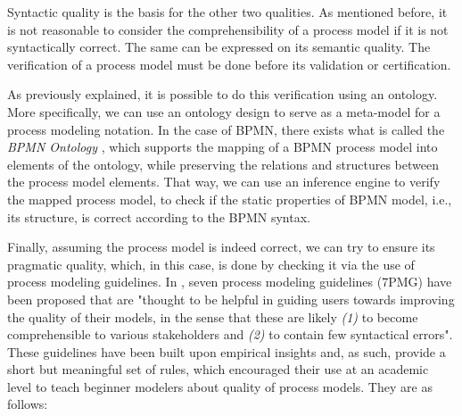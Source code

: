 \documentclass[a4paper,twoside]{article}
\begin{document}
Syntactic quality is the basis for the other two qualities. As mentioned before, it is not reasonable to consider the comprehensibility of a process model if it is not syntactically correct. The same can be expressed on its semantic quality. The verification of a process model must be done before its validation or certification.

As previously explained, it is possible to do this verification using an ontology. More specifically, we can use an ontology design to serve as a meta-model for a process modeling notation. In the case of BPMN, there exists what is called the \textit{BPMN Ontology} \citep{Rospocher2014foisbpmn}, which supports the mapping of a BPMN process model into elements of the ontology, while preserving the relations and structures between the process model elements. That way, we can use an inference engine to verify the mapped process model, to check if the static properties of BPMN model, i.e., its structure, is correct according to the BPMN syntax.



Finally, assuming the process model is indeed correct, we can try to ensure its pragmatic quality, which, in this case, is done by checking it via the use of process modeling guidelines.  In \citet[pag.~3]{Mendling2010}, seven process modeling guidelines (7PMG) have been proposed that are "thought to be helpful in guiding users towards improving the quality of their models, in the sense that these are likely \textit{(1)} to become comprehensible to various stakeholders and \textit{(2)} to contain few syntactical errors". These guidelines have been built upon empirical insights and, as such, provide a short but meaningful set of rules, which encouraged their use at an academic level to teach beginner modelers about quality of process models. They are as follows:
\end{document}
